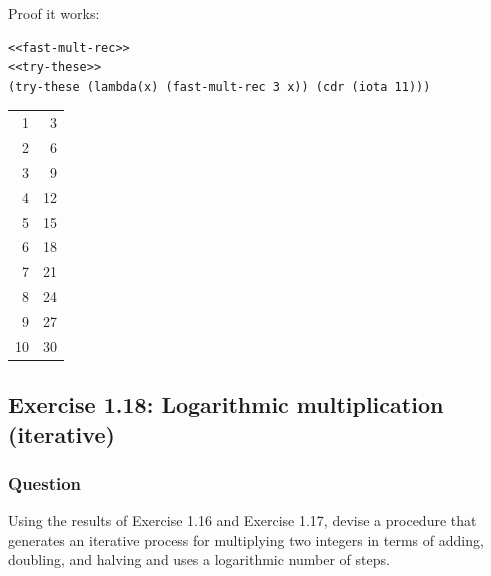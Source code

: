 \documentclass[final,fleqn,titlepage,twoside]{article}
\begin{document}
Proof it works:

\begin{verbatim}
<<fast-mult-rec>>
<<try-these>>
(try-these (lambda(x) (fast-mult-rec 3 x)) (cdr (iota 11)))
\end{verbatim}

\begin{center}
\begin{tabular}{rr}
1 & 3\\[0pt]
2 & 6\\[0pt]
3 & 9\\[0pt]
4 & 12\\[0pt]
5 & 15\\[0pt]
6 & 18\\[0pt]
7 & 21\\[0pt]
8 & 24\\[0pt]
9 & 27\\[0pt]
10 & 30\\[0pt]
\end{tabular}
\end{center}

\subsection{Exercise 1.18: Logarithmic multiplication (iterative)}
\label{sec:org286a17c}
\subsubsection{Question}
\label{sec:orgda3870b}
Using the results of Exercise 1.16 and Exercise 1.17, devise a procedure that
generates an iterative process for multiplying two integers in terms of adding,
doubling, and halving and uses a logarithmic number of steps.
\end{document}
